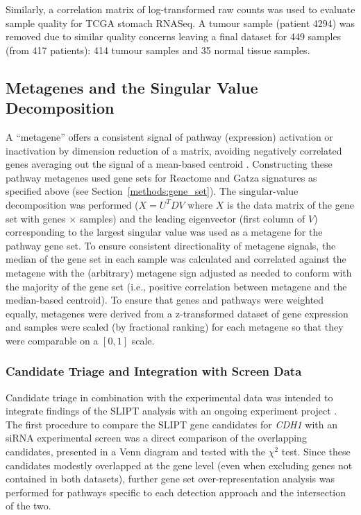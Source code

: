 Similarly, a correlation matrix of log-transformed raw counts was used to evaluate sample quality for \gls{TCGA} stomach RNASeq. A tumour sample (patient 4294) was removed due to similar quality concerns leaving a final dataset for 449 samples (from 417 patients): 414 tumour samples and 35 normal tissue samples.

\subsection{Metagenes and the Singular Value Decomposition} \label{methods:metagene}
A ``metagene'' offers a consistent signal of pathway (expression) activation or inactivation by dimension reduction of a matrix, avoiding negatively correlated genes averaging out the signal of a mean-based centroid \citep{Huang2003}. Constructing these pathway metagenes used gene sets for Reactome and Gatza signatures \citep{Gatza2011, Gatza2014} as specified above (see Section~\ref{methods:gene_set}). The singular-value decomposition was performed ($X = U^{T} D V$ where $X$ is the data matrix of the gene set with genes $\times$ samples) and the leading eigenvector (first column of $V$) corresponding to the largest singular value was used as a metagene for the pathway gene set. To ensure consistent directionality of metagene signals, the median of the gene set in each sample was calculated and correlated against the metagene with the (arbitrary) metagene sign adjusted as needed to conform with the majority of the gene set (i.e., positive correlation between metagene and the median-based centroid). To ensure that genes and pathways were weighted equally, metagenes were derived from a z-transformed dataset of gene expression and samples were scaled (by fractional ranking) for each metagene so that they were comparable on a $[0,1]$ scale. 

\subsubsection{Candidate Triage and Integration with Screen Data} \label{methods:venn_analysis}
Candidate triage in combination with the experimental data was intended to integrate findings of the \gls{SLIPT} analysis with an ongoing experiment project \citep{Chen2014, Telford2015}. The first procedure to compare the \gls{SLIPT} gene candidates for \textit{CDH1} with an \gls{siRNA} experimental screen \citep{Telford2015} was a direct comparison of the overlapping candidates, presented in a Venn diagram and tested with the $\chi^2$ test. Since these candidates modestly overlapped at the gene level (even when excluding genes not contained in both datasets), further gene set over-representation analysis was performed for pathways specific to each detection approach and the intersection of the two.

